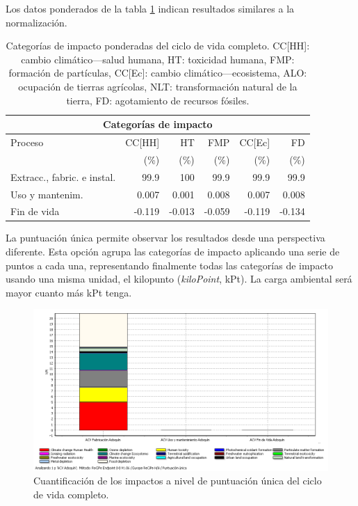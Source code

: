 Los datos ponderados de la tabla \ref{categoriasimpactocompletoponderados} indican resultados similares a la normalización.

\begin{table}[!htb]
\centering
\begin{tabular}{p{4cm}rrrrr}
\toprule
\multicolumn{6}{c}{Categorías de impacto}\\
\midrule
Proceso & CC[HH] & HT & FMP & CC[Ec] & FD\\
 &  (\%) & (\%) & (\%) & (\%) & (\%)\\
\midrule
Extracc., fabric. e instal. & 99.9 & 100 & 99.9 & 99.9 & 99.9\\
Uso y mantenim. & 0.007 & 0.001 & 0.008 & 0.007 & 0.008\\
Fin de vida & -0.119 & -0.013 & -0.059 & -0.119 & -0.134\\
\bottomrule
\end{tabular}
\caption[Categorías de impacto ponderadas del ciclo de vida completo..]{Categorías de impacto ponderadas del ciclo de vida completo. CC[HH]: cambio climático—salud humana, HT: toxicidad humana, FMP: formación de partículas, CC[Ec]: cambio climático—ecosistema, ALO: ocupación de tierras agrícolas, NLT: transformación natural de la tierra, FD: agotamiento de recursos fósiles.}
\label{categoriasimpactocompletoponderados}
\end{table}

La puntuación única permite observar los resultados desde una perspectiva diferente. Esta opción agrupa las categorías de impacto aplicando una serie de puntos a cada una, representando finalmente todas las categorías de impacto usando una misma unidad, el kilopunto (\textit{kiloPoint}, kPt). La carga ambiental será mayor cuanto más kPt tenga.

\begin{figure}[!htb]
\centering
\includegraphics[width=15cm]{img/completo_puntuacionunica.png}
\caption{Cuantificación de los impactos a nivel de puntuación única del ciclo de vida completo.}
\label{fig:completo_puntuacionunica}
\end{figure}

